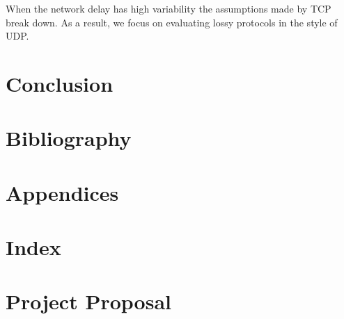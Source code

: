 \documentclass[withindex,glossary,openany]{cam-thesis}
\begin{document}
When the network delay has high variability the assumptions made by TCP break down. As a result, we focus on evaluating lossy protocols in the style of UDP.


\chapter{Conclusion}

\chapter{Bibliography}

\chapter{Appendices}

\chapter{Index}

\chapter{Project Proposal}




\printthesisindex
\end{document}

